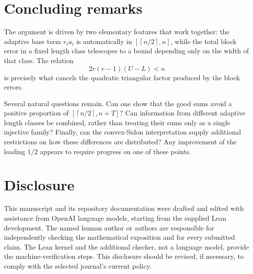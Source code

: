 \documentclass[11pt]{article}
\numberwithin{equation}{section}
\theoremstyle{remark}
\newcommand{\ceil}[1]{\left\lceil #1\right\rceil}
\begin{document}
\section{Concluding remarks}

The argument is driven by two elementary features that work together:
the adaptive base term \(r_i a_i\) is automatically in
\([\ceil{n/2},n]\), while the total block error in a fixed length class
telescopes to a bound depending only on the width of that class.
The relation
\[
  2r(r-1)(U-L)<n
\]
is precisely what cancels the quadratic triangular factor produced by
the block errors.

Several natural questions remain.  Can one show that the good sums
avoid a positive proportion of
\([\ceil{n/2},n+T]\)?  Can information from different adaptive length
classes be combined, rather than treating their sums only as a single
injective family?  Finally, can the convex-Sidon interpretation supply
additional restrictions on how these differences are distributed?
Any improvement of the leading \(1/2\) appears to require progress on
one of these points.

\section*{Disclosure}

This manuscript and its repository documentation were drafted and
edited with assistance from OpenAI language models, starting from the
supplied Lean development.  The named human author or authors are
responsible for independently checking the mathematical exposition and
for every submitted claim.  The Lean kernel and the additional checker,
not a language model, provide the machine-verification steps.  This
disclosure should be revised, if necessary, to comply with the selected
journal's current policy.
\end{document}
